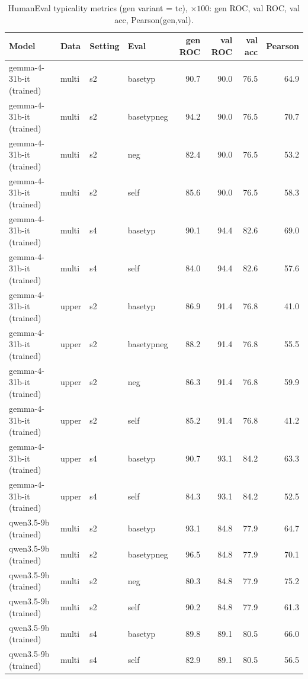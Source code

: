 \begin{table}[ht]\centering
\caption{HumanEval typicality metrics (gen variant = tc), $\times 100$: gen ROC, val ROC, val acc, Pearson(gen,val).}\label{tab:he_metrics}
\begin{tabular}{llll rrrr}
\toprule
Model & Data & Setting & Eval & gen ROC & val ROC & val acc & Pearson \\
\midrule
gemma-4-31b-it (trained) & multi & s2 & basetyp & 90.7 & 90.0 & 76.5 & 64.9 \\
gemma-4-31b-it (trained) & multi & s2 & basetypneg & 94.2 & 90.0 & 76.5 & 70.7 \\
gemma-4-31b-it (trained) & multi & s2 & neg & 82.4 & 90.0 & 76.5 & 53.2 \\
gemma-4-31b-it (trained) & multi & s2 & self & 85.6 & 90.0 & 76.5 & 58.3 \\
gemma-4-31b-it (trained) & multi & s4 & basetyp & 90.1 & 94.4 & 82.6 & 69.0 \\
gemma-4-31b-it (trained) & multi & s4 & self & 84.0 & 94.4 & 82.6 & 57.6 \\
\midrule
gemma-4-31b-it (trained) & upper & s2 & basetyp & 86.9 & 91.4 & 76.8 & 41.0 \\
gemma-4-31b-it (trained) & upper & s2 & basetypneg & 88.2 & 91.4 & 76.8 & 55.5 \\
gemma-4-31b-it (trained) & upper & s2 & neg & 86.3 & 91.4 & 76.8 & 59.9 \\
gemma-4-31b-it (trained) & upper & s2 & self & 85.2 & 91.4 & 76.8 & 41.2 \\
gemma-4-31b-it (trained) & upper & s4 & basetyp & 90.7 & 93.1 & 84.2 & 63.3 \\
gemma-4-31b-it (trained) & upper & s4 & self & 84.3 & 93.1 & 84.2 & 52.5 \\
\midrule
qwen3.5-9b (trained) & multi & s2 & basetyp & 93.1 & 84.8 & 77.9 & 64.7 \\
qwen3.5-9b (trained) & multi & s2 & basetypneg & 96.5 & 84.8 & 77.9 & 70.1 \\
qwen3.5-9b (trained) & multi & s2 & neg & 80.3 & 84.8 & 77.9 & 75.2 \\
qwen3.5-9b (trained) & multi & s2 & self & 90.2 & 84.8 & 77.9 & 61.3 \\
qwen3.5-9b (trained) & multi & s4 & basetyp & 89.8 & 89.1 & 80.5 & 66.0 \\
qwen3.5-9b (trained) & multi & s4 & self & 82.9 & 89.1 & 80.5 & 56.5 \\

\end{tabular}
\end{table}
